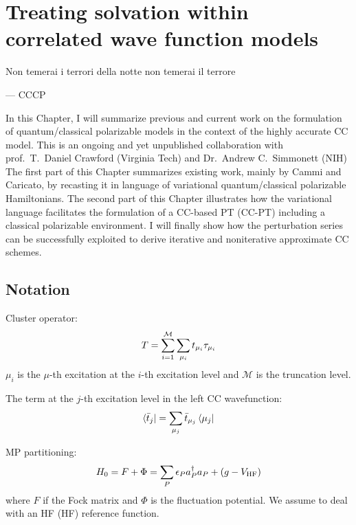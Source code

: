 \chapter{Treating solvation within correlated wave function models}\label{ch:PCMCC}

\epigraph{Non temerai i terrori della notte non temerai il terrore}{--- \textsc{CCCP}}

In this Chapter, I will summarize previous and current work on the
formulation of quantum/classical polarizable models in the context of
the highly accurate \acl{CC} model.
This is an ongoing and yet unpublished collaboration with prof.~T.~Daniel Crawford
(Virginia Tech) and Dr.~Andrew C.~Simmonett (NIH)
The first part of this Chapter summarizes existing work, mainly by Cammi
and Caricato, by recasting it in language of variational
quantum/classical polarizable Hamiltonians.
The second part of this Chapter illustrates how the variational language
facilitates the formulation of a \acl{CC}-based \acl{PT} (\acs{CC}-\acs{PT})
including a classical polarizable environment.
I will finally show how the perturbation series can be successfully
exploited to derive iterative and noniterative approximate \acs{CC}
schemes.

\pagebreak

\section{Notation}
Cluster operator:
\begin{equation}
  T = \sum_{i=1}^\mathcal{M}\sum_{\mu_i}t_{\mu_i}\tau_{\mu_i}
\end{equation}
$\mu_i$ is the $\mu$-th excitation at the $i$-th
excitation level and $\mathcal{M}$ is the truncation level.

The term at the $j$-th excitation level in the left CC wavefunction:
\begin{equation}
  \bra{\bar{t}_{j}} = \sum_{\mu_j}\bar{t}_{\mu_j}\bra{\mu_j}
\end{equation}

\acl{MP} partitioning:
\begin{equation}
 H_0 = F + \Phi = \sum_P\epsilon_Pa_{P}^{\dagger}a_{P} + (g- V_\mathrm{HF})
\end{equation}
where $F$ if the Fock matrix and $\Phi$ is the fluctuation potential.
We assume to deal with an \acl{HF} (\acs{HF}) reference function.

